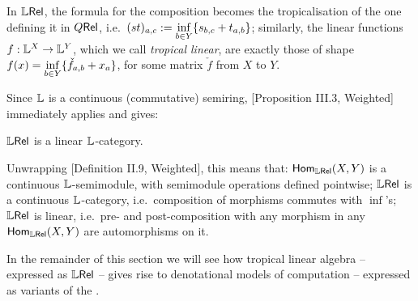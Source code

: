 \begin{remark}
 In $\mathbb{L} \mathsf{Rel}$, the formula for the composition becomes the tropicalisation of the one defining it in $Q \mathsf{Rel}$, i.e.\ $(st)_{a,c}:=\inf\limits_{b\in Y}\{s_{b,c}+t_{a,b}\}$;
 similarly, the linear functions $f:\mathbb{L}^X\to \mathbb{L}^Y$, which we call \emph{tropical linear}, are exactly those of shape $f(x)=\inf\limits_{b\in Y} \{\check f_{a,b}+x_a\}$, for some matrix $\check f$ from $X$ to $Y$.
\end{remark}

Since $\mathbb{L}$ is a continuous (commutative) semiring, [Proposition III.3, Weighted] immediately applies and gives:

\begin{fact}
 $\mathbb{L} \mathsf{Rel}$ is a linear $\mathbb{L}$-category.
\end{fact}

Unwrapping [Definition II.9, Weighted], this means that:
$\mathsf{Hom}_{\mathbb{L} \mathsf{Rel}}(X,Y)$ is a continuous $\mathbb{L}$-semimodule, with semimodule operations defined pointwise;
$\mathbb{L} \mathsf{Rel}$ is a continuous $\mathbb{L}$-category, i.e.\ composition of morphisms commutes with $\inf$'s;
$\mathbb{L} \mathsf{Rel}$ is linear, i.e.\ pre- and post-composition with any morphism in any $\mathsf{Hom}_{\mathbb{L} \mathsf{Rel}}(X,Y)$ are automorphisms on it.

In the remainder of this section we will see how tropical linear algebra -- expressed as $\mathbb{L} \mathsf{Rel}$ -- gives rise to denotational models of computation -- expressed as variants of the \lamcalc.
